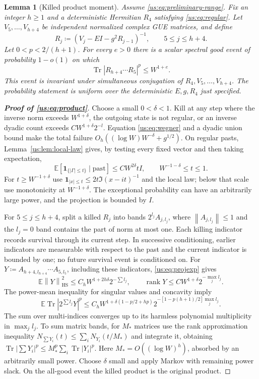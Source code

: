 \documentclass[11pt]{article}
\numberwithin{equation}{section}
\newtheorem{lemma}[theorem]{Lemma}
\theoremstyle{remark}
\newcommand{\E}{\mathbb E}
\newcommand{\Tr}{\operatorname{Tr}}
\newcommand{\rank}{\operatorname{rank}}
\newcommand{\HS}{\mathrm{HS}}
\newcommand{\one}{\mathbf 1}
\newcommand{\norm}[1]{\left\|#1\right\|}
\begin{document}
\begin{lemma}[Killed product moment]\label{us:lem:product}
Assume \eqref{us:eq:preliminary-range}. Fix an integer $h\ge1$ and a
deterministic Hermitian $R_4$ satisfying \eqref{us:eq:regular}.
Let $V_5,\ldots,V_{h+4}$ be independent normalized complex GUE matrices,
and define
\[
 R_j\coloneqq(V_j-EI-g^2R_{j-1})^{-1},\qquad 5\le j\le h+4.
\]
Let $0<p<2/(h+1)$. For every $e>0$
there is a scalar spectral good event of probability $1-o(1)$ on which
\begin{equation}
 \Tr|R_{h+4}\cdots R_5|^p\le W^{1+e}.
 \label{us:eq:product}
\end{equation}
This event is invariant under simultaneous conjugation of
$R_4,V_5,\ldots,V_{h+4}$. The probability statement is uniform over
the deterministic $E,g,R_4$ just specified.
\end{lemma}

\begin{proof}[\textbf{Proof of \eqref{us:eq:product}}]
Choose a small $0<\delta<1$. Kill at any step where the inverse norm exceeds
$W^{1+\delta}$, the outgoing state is not regular, or an inverse dyadic
count exceeds $CW^{1+\delta}2^{-l}$. Equation \eqref{us:eq:wegner} and a
dyadic union bound make the total failure $O_h((\log W)W^{-\delta}+g^{1/2})$.
On regular pasts, Lemma~\ref{us:lem:local-law} gives, by testing every
fixed vector and then taking expectation,
\begin{equation}
 \E[\one_{\{|\Gamma|\le t\}}\mid\text{past}]
 \le CW^{2\delta}tI,
 \qquad W^{-1-\delta}\le t\le1.
 \label{us:eq:projexp}
\end{equation}
For $t\ge W^{-1+\delta}$ use
$\one_{|x|\le t}\le2t\Im(x-it)^{-1}$ and the local law; below that
scale use monotonicity at $W^{-1+\delta}$. The exceptional probability
can have an arbitrarily large power, and the projection is bounded by $I$.

For $5\le j\le h+4$, split a killed $R_j$ into bands $2^{l_j}A_{j,l_j}$, where
$\norm{A_{j,l_j}}\le1$ and the $l_j=0$ band contains the part of norm
at most one. Each killing indicator records survival through its
current step. In successive conditioning, earlier indicators are
measurable with respect to the past and the current indicator is
bounded by one; no future survival event is conditioned on.
For $Y\coloneqq A_{h+4,l_{h+4}}\cdots A_{5,l_5}$, including these
indicators, \eqref{us:eq:projexp} gives
\[
 \E\norm{Y}_{\HS}^2\le C_hW^{1+2h\delta}2^{-\sum l_j},\qquad
 \rank Y\le CW^{1+\delta}2^{-\max_j l_j}.
\]
The power-mean inequality for singular values and concavity imply
\[
 \E\Tr|2^{\sum l_j}Y|^p
 \le C_h W^{1+\delta(1-p/2+hp)}
       2^{-[1-p(h+1)/2]\max_j l_j}.
\]
The sum over multi-indices converges up to its harmless polynomial
multiplicity in $\max_j l_j$. To sum matrix bands, for $M_*$ matrices use the
rank approximation inequality
$N_{\sum Y_i}(t)\le\sum_iN_{Y_i}(t/M_*)$ and integrate it, obtaining
$\Tr|\sum Y_i|^p\le M_*^p\sum_i\Tr|Y_i|^p$.
Here $M_*=O((\log W)^h)$, absorbed by an arbitrarily small power.
Choose $\delta$ small and apply Markov with remaining power slack.
On the all-good event the killed product is the original product.
\end{proof}
\end{document}
